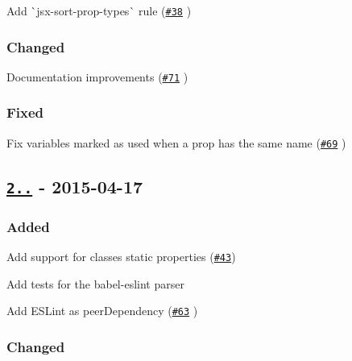 \begin{DoxyItemize}
\item Add \`{}jsx-\/sort-\/prop-\/types\`{} rule (\href{https://github.com/yannickcr/eslint-plugin-react/issues/38}{\tt \#38} )
\end{DoxyItemize}

\subsubsection*{Changed}


\begin{DoxyItemize}
\item Documentation improvements (\href{https://github.com/yannickcr/eslint-plugin-react/pull/71}{\tt \#71} )
\end{DoxyItemize}

\subsubsection*{Fixed}


\begin{DoxyItemize}
\item Fix variables marked as used when a prop has the same name (\href{https://github.com/yannickcr/eslint-plugin-react/pull/69}{\tt \#69} )
\end{DoxyItemize}

\subsection*{\href{https://github.com/yannickcr/eslint-plugin-react/compare/v2.1.0...v2.1.1}{\tt 2..} -\/ 2015-\/04-\/17}

\subsubsection*{Added}


\begin{DoxyItemize}
\item Add support for classes static properties (\href{https://github.com/yannickcr/eslint-plugin-react/issues/43}{\tt \#43})
\item Add tests for the {\ttfamily babel-\/eslint} parser
\item Add E\+S\+Lint as peer\+Dependency (\href{https://github.com/yannickcr/eslint-plugin-react/pull/63}{\tt \#63} )
\end{DoxyItemize}

\subsubsection*{Changed}


